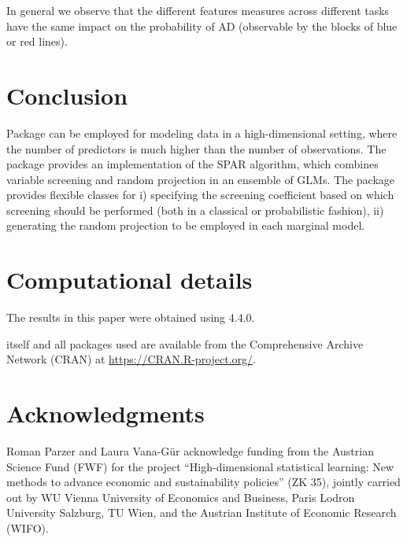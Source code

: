 \documentclass[
  article]{jss}
\begin{document}
In general we observe that the different features measures across
different tasks have the same impact on the probability of AD
(observable by the blocks of blue or red lines).

\section{Conclusion}\label{sec-conclusion}

Package  can be employed for modeling data in a
high-dimensional setting, where the number of predictors is much higher
than the number of observations. The package provides an implementation
of the SPAR algorithm, which combines variable screening and random
projection in an ensemble of GLMs. The package provides flexible classes
for i) specifying the screening coefficient based on which screening
should be performed (both in a classical or probabilistic fashion), ii)
generating the random projection to be employed in each marginal model.

\section*{Computational details}\label{computational-details}

The results in this paper were obtained using  4.4.0.

 itself and all packages used are available from the
Comprehensive  Archive Network (CRAN) at
\url{https://CRAN.R-project.org/}.

\section*{Acknowledgments}\label{acknowledgments}

Roman Parzer and Laura Vana-Gür acknowledge funding from the Austrian
Science Fund (FWF) for the project ``High-dimensional statistical
learning: New methods to advance economic and sustainability policies''
(ZK 35), jointly carried out by WU Vienna University of Economics and
Business, Paris Lodron University Salzburg, TU Wien, and the Austrian
Institute of Economic Research (WIFO).


\renewcommand\refname{References}
  
\end{document}
